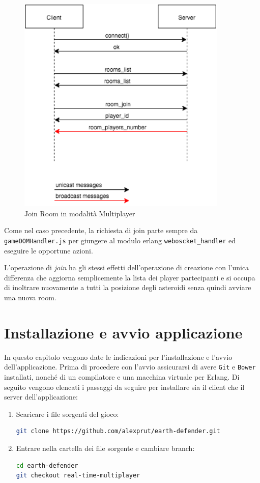 \documentclass[paper=a4, fontsize=11pt]{scrartcl} %
\numberwithin{equation}{section} %
\numberwithin{figure}{section} %
\numberwithin{table}{section} %
\begin{document}
\begin{figure}
\centering
\includegraphics[width=10cm]{MultiplayerJoinRoom}
\caption{Join Room in modalità Multiplayer}
\label{JoinRoom}
\end{figure}

Come nel caso precedente, la richiesta di join parte sempre da \texttt{gameDOMHandler.js} per giungere al modulo erlang \texttt{weboscket\_handler} ed eseguire le opportune azioni.

L'operazione di \textit{join} ha gli stessi effetti dell'operazione di creazione con l'unica differenza che aggiorna semplicemente la lista dei player partecipanti e si occupa di inoltrare nuovamente a tutti la posizione degli asteroidi senza quindi avviare una nuova room. 



\section{Installazione e avvio applicazione}
In questo capitolo vengono date le indicazioni per l'installazione e l'avvio dell'applicazione.
Prima di procedere con l'avvio assicurarsi di avere \texttt{Git}\cite{git} e \texttt{Bower}\cite{bower} installati, nonché di un compilatore e una macchina virtuale per Erlang.
Di seguito vengono elencati i passaggi da seguire per installare sia il client che il server dell'applicazione:
\begin{enumerate}  
\item
Scaricare i file sorgenti del gioco:
\begin{lstlisting}[language=bash]
git clone https://github.com/alexprut/earth-defender.git
\end{lstlisting}

\item
Entrare nella cartella dei file sorgente e cambiare branch:
\begin{lstlisting}[language=bash]
cd earth-defender
git checkout real-time-multiplayer
\end{lstlisting}
\end{enumerate}
\end{document}
